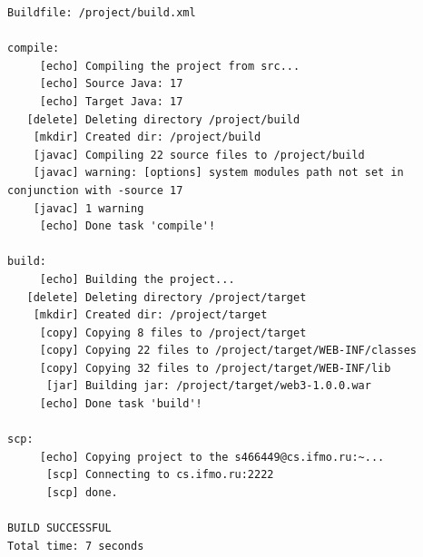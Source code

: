 \begin{lstlisting}[caption={Лог цели \texttt{scp}},language={},captionpos=b]
Buildfile: /project/build.xml

compile:
     [echo] Compiling the project from src...
     [echo] Source Java: 17
     [echo] Target Java: 17
   [delete] Deleting directory /project/build
    [mkdir] Created dir: /project/build
    [javac] Compiling 22 source files to /project/build
    [javac] warning: [options] system modules path not set in conjunction with -source 17
    [javac] 1 warning
     [echo] Done task 'compile'!

build:
     [echo] Building the project...
   [delete] Deleting directory /project/target
    [mkdir] Created dir: /project/target
     [copy] Copying 8 files to /project/target
     [copy] Copying 22 files to /project/target/WEB-INF/classes
     [copy] Copying 32 files to /project/target/WEB-INF/lib
      [jar] Building jar: /project/target/web3-1.0.0.war
     [echo] Done task 'build'!

scp:
     [echo] Copying project to the s466449@cs.ifmo.ru:~...
      [scp] Connecting to cs.ifmo.ru:2222
      [scp] done.

BUILD SUCCESSFUL
Total time: 7 seconds
\end{lstlisting}
